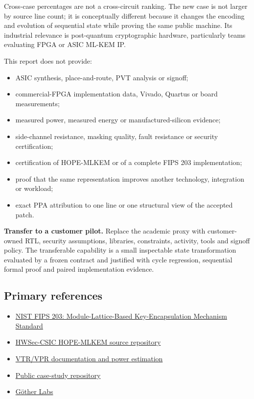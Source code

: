 \documentclass[10pt,a4paper]{article}
\begin{document}
Cross-case percentages are not a cross-circuit ranking. The new case is not larger by source line count; it is conceptually different because it changes the encoding and evolution of sequential state while proving the same public machine. Its industrial relevance is post-quantum cryptographic hardware, particularly teams evaluating FPGA or ASIC ML-KEM IP.

This report does not provide:
\begin{itemize}
  \item ASIC synthesis, place-and-route, PVT analysis or signoff;
  \item commercial-FPGA implementation data, Vivado, Quartus or board measurements;
  \item measured power, measured energy or manufactured-silicon evidence;
  \item side-channel resistance, masking quality, fault resistance or security certification;
  \item certification of HOPE-MLKEM or of a complete FIPS 203 implementation;
  \item proof that the same representation improves another technology, integration or workload;
  \item exact PPA attribution to one line or one structural view of the accepted patch.
\end{itemize}

\begin{claimbox}
\textbf{Transfer to a customer pilot.} Replace the academic proxy with customer-owned RTL, security assumptions, libraries, constraints, activity, tools and signoff policy. The transferable capability is a small inspectable state transformation evaluated by a frozen contract and justified with cycle regression, sequential formal proof and paired implementation evidence.
\end{claimbox}

\subsection{Primary references}
\begin{itemize}
  \item \href{https://csrc.nist.gov/pubs/fips/203/final}{NIST FIPS 203: Module-Lattice-Based Key-Encapsulation Mechanism Standard}
  \item \href{https://github.com/HWSec-CSIC/hope-mlkem}{HWSec-CSIC HOPE-MLKEM source repository}
  \item \href{https://docs.verilogtorouting.org/en/latest/vpr/}{VTR/VPR documentation and power estimation}
  \item \href{https://github.com/juan-fernandez-gotherlabs/rtl-optimization-case-study}{Public case-study repository}
  \item \href{https://www.gotherlabs.com/}{Göther Labs}
\end{itemize}
\end{document}
